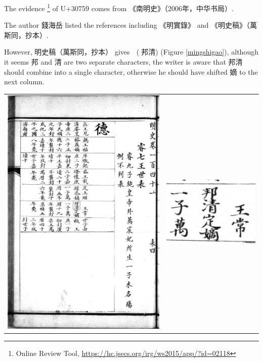 \documentclass{article}
\begin{document}
The evidence \footnote{Online Review Tool, \url{https://hc.jsecs.org/irg/ws2015/app/?id=02118}} of U+30759 comes from 《南明史》（2006年，中华书局）\cite[p. 1003]{南明史}.

The author 錢海岳 listed the references \cite[p. 5517]{南明史} including 《明實錄》 and 《明史稿》（萬斯同，抄本）.

\newpage

However, 明史稿（萬斯同，抄本）\cite{明史稿萬斯同} gives {\huge 﫠} (⿱邦清) (Figure \ref{mingshigao}), although it seems 邦 and 清 are two separate characters, the writer is aware that 邦清 should combine into a single character, otherwise he should have shifted 嫡 to the next column.

\begin{center}
    \begin{tabular}{ c c }
        \includegraphics[height=.89\textheight]{95-0.jpg} & \includegraphics[width=.3\textwidth]{95-0-crop.png}
    \end{tabular}
    \label{mingshigao}
\end{center}
\end{document}
